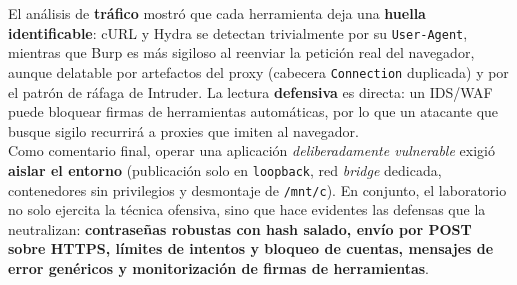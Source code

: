 \documentclass[letter,12pt]{article}
\begin{document}
El análisis de \textbf{tráfico} mostró que cada herramienta deja una \textbf{huella identificable}: cURL y Hydra se detectan trivialmente por su \texttt{User-Agent}, mientras que Burp es más sigiloso al reenviar la petición real del navegador, aunque delatable por artefactos del proxy (cabecera \texttt{Connection} duplicada) y por el patrón de ráfaga de Intruder. La lectura \textbf{defensiva} es directa: un IDS/WAF puede bloquear firmas de herramientas automáticas, por lo que un atacante que busque sigilo recurrirá a proxies que imiten al navegador. \\


Como comentario final, operar una aplicación \emph{deliberadamente vulnerable} exigió \textbf{aislar el entorno} (publicación solo en \texttt{loopback}, red \emph{bridge} dedicada, contenedores sin privilegios y desmontaje de \texttt{/mnt/c}). En conjunto, el laboratorio no solo ejercita la técnica ofensiva, sino que hace evidentes las defensas que la neutralizan: \textbf{contraseñas robustas con hash salado, envío por POST sobre HTTPS, límites de intentos y bloqueo de cuentas, mensajes de error genéricos y monitorización de firmas de herramientas}. \\
\end{document}
